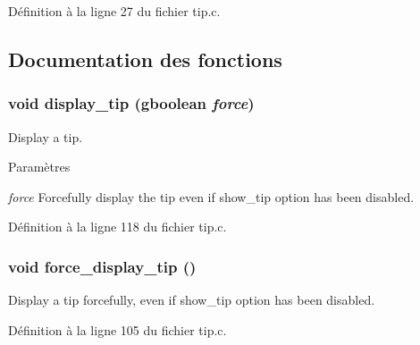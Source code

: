 Définition à la ligne 27 du fichier tip.c.



\subsection{Documentation des fonctions}
\subsubsection[{display\_\-tip}]{\setlength{\rightskip}{0pt plus 5cm}void display\_\-tip (gboolean {\em force})}\label{tip_8c_a2486cf426d5d82b254fbd3caab2e253f}
Display a tip.


\begin{DoxyParams}{Paramètres}
\item[{\em force}]Forcefully display the tip even if show\_\-tip option has been disabled. \end{DoxyParams}


Définition à la ligne 118 du fichier tip.c.

\subsubsection[{force\_\-display\_\-tip}]{\setlength{\rightskip}{0pt plus 5cm}void force\_\-display\_\-tip ()}\label{tip_8c_a52290240d6d8d2a09291865bab161a6d}
Display a tip forcefully, even if show\_\-tip option has been disabled. 

Définition à la ligne 105 du fichier tip.c.


